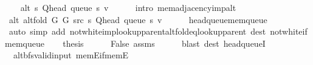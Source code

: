 \begin{isabellebody}
\ \ \isamarkupfalse%
\ {\isachardoublequoteopen}alt\ s\ {\isacharparenleft}{\kern0pt}Q{\isacharunderscore}{\kern0pt}head\ {\isacharparenleft}{\kern0pt}queue\ s{\isacharparenright}{\kern0pt}{\isacharparenright}{\kern0pt}\ v{\isachardoublequoteclose}\isanewline
\ \ \ \ \isamarkupfalse%
\ {\isacharparenleft}{\kern0pt}intro\ mem{\isacharunderscore}{\kern0pt}adjacency{\isacharunderscore}{\kern0pt}imp{\isacharunderscore}{\kern0pt}alt{\isacharparenright}{\kern0pt}\isanewline
\ \ \isamarkupfalse%
\ {\isachardoublequoteopen}alt\ {\isacharparenleft}{\kern0pt}alt{\isacharunderscore}{\kern0pt}fold\ G{}\ G{}\ src\ s{\isacharparenright}{\kern0pt}\ {\isacharparenleft}{\kern0pt}Q{\isacharunderscore}{\kern0pt}head\ {\isacharparenleft}{\kern0pt}queue\ s{\isacharparenright}{\kern0pt}{\isacharparenright}{\kern0pt}\ v{\isachardoublequoteclose}\isanewline
\ \ \ \ \isamarkupfalse%
\ head{\isacharunderscore}{\kern0pt}queue{\isacharunderscore}{\kern0pt}mem{\isacharunderscore}{\kern0pt}queue\isanewline
\ \ \ \ \isamarkupfalse%
\ {\isacharparenleft}{\kern0pt}auto\ simp\ add{\isacharcolon}{\kern0pt}\ not{\isacharunderscore}{\kern0pt}white{\isacharunderscore}{\kern0pt}imp{\isacharunderscore}{\kern0pt}lookup{\isacharunderscore}{\kern0pt}parent{\isacharunderscore}{\kern0pt}alt{\isacharunderscore}{\kern0pt}fold{\isacharunderscore}{\kern0pt}eq{\isacharunderscore}{\kern0pt}lookup{\isacharunderscore}{\kern0pt}parent\ dest{\isacharcolon}{\kern0pt}\ not{\isacharunderscore}{\kern0pt}white{\isacharunderscore}{\kern0pt}if{\isacharunderscore}{\kern0pt}mem{\isacharunderscore}{\kern0pt}queue{\isacharparenright}{\kern0pt}\isanewline
\ \ \isamarkupfalse%
\ {\isacharquery}{\kern0pt}thesis\isanewline
\ \ \ \ \isamarkupfalse%
\ False\ assms\isanewline
\ \ \ \ \isamarkupfalse%
\ {\isacharparenleft}{\kern0pt}blast\ dest{\isacharcolon}{\kern0pt}\ head{\isacharunderscore}{\kern0pt}queueI{\isacharparenright}{\kern0pt}\isanewline
{}\isamarkupfalse%
%
\endisatagproof
{\isafoldproof}%
%
\isadelimproof
\isanewline
%
\endisadelimproof
%
\isadeliminvisible
\isanewline
%
\endisadeliminvisible
%
\isataginvisible
{}\isamarkupfalse%
\ {\isacharparenleft}{\kern0pt}\ alt{\isacharunderscore}{\kern0pt}bfs{\isacharunderscore}{\kern0pt}valid{\isacharunderscore}{\kern0pt}input{\isacharparenright}{\kern0pt}\ mem{\isacharunderscore}{\kern0pt}E{\isacharunderscore}{\kern0pt}if{\isacharunderscore}{\kern0pt}mem{\isacharunderscore}{\kern0pt}E{}{\isacharcolon}{\kern0pt}\isanewline

\end{isabellebody}
